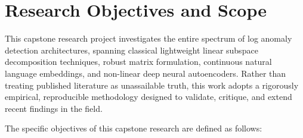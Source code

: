 \section{Research Objectives and Scope}
\label{sec:intro_objectives}
This capstone research project investigates the entire spectrum of log anomaly detection architectures, spanning classical lightweight linear subspace decomposition techniques, robust matrix formulation, continuous natural language embeddings, and non-linear deep neural autoencoders. Rather than treating published literature as unassailable truth, this work adopts a rigorously empirical, reproducible methodology designed to validate, critique, and extend recent findings in the field.

The specific objectives of this capstone research are defined as follows:

